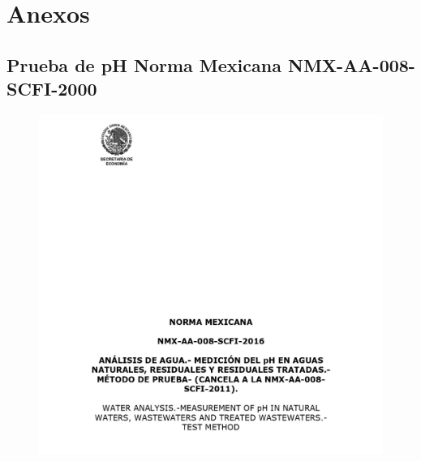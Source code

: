 \section*{Anexos}
\subsection*{Prueba de pH Norma Mexicana NMX-AA-008-SCFI-2000}
\begin{center}
	\begin{figure}[h]
		\includegraphics*[scale=0.75]{../Images/nmx-aa-008-scfi-2016_page-0001.jpg}
	\end{figure}
\end{center}
\clearpage

